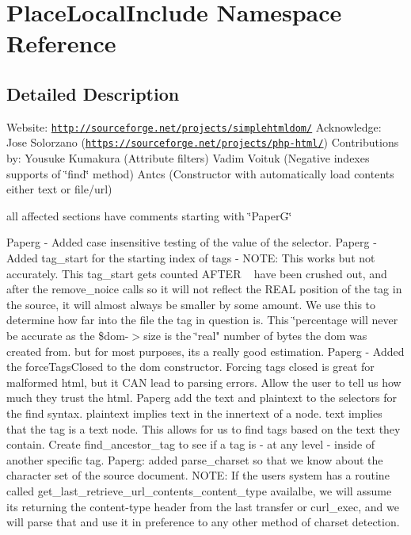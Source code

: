 \hypertarget{namespace_place_local_include}{}\section{Place\+Local\+Include Namespace Reference}
\label{namespace_place_local_include}


\subsection{Detailed Description}
Website\+: \href{http://sourceforge.net/projects/simplehtmldom/}{\tt http\+://sourceforge.\+net/projects/simplehtmldom/} Acknowledge\+: Jose Solorzano (\href{https://sourceforge.net/projects/php-html/}{\tt https\+://sourceforge.\+net/projects/php-\/html/}) Contributions by\+: Yousuke Kumakura (Attribute filters) Vadim Voituk (Negative indexes supports of \char`\"{}find\char`\"{} method) Antcs (Constructor with automatically load contents either text or file/url)

all affected sections have comments starting with \char`\"{}\+Paper\+G\char`\"{}

Paperg -\/ Added case insensitive testing of the value of the selector. Paperg -\/ Added tag\+\_\+start for the starting index of tags -\/ N\+O\+TE\+: This works but not accurately. This tag\+\_\+start gets counted A\+F\+T\+ER ~\newline
 have been crushed out, and after the remove\+\_\+noice calls so it will not reflect the R\+E\+AL position of the tag in the source, it will almost always be smaller by some amount. We use this to determine how far into the file the tag in question is. This \char`\"{}percentage will never be accurate as the \$dom-\/$>$size is the \char`\"{}real" number of bytes the dom was created from. but for most purposes, it\textquotesingle{}s a really good estimation. Paperg -\/ Added the force\+Tags\+Closed to the dom constructor. Forcing tags closed is great for malformed html, but it C\+AN lead to parsing errors. Allow the user to tell us how much they trust the html. Paperg add the text and plaintext to the selectors for the find syntax. plaintext implies text in the innertext of a node. text implies that the tag is a text node. This allows for us to find tags based on the text they contain. Create find\+\_\+ancestor\+\_\+tag to see if a tag is -\/ at any level -\/ inside of another specific tag. Paperg\+: added parse\+\_\+charset so that we know about the character set of the source document. N\+O\+TE\+: If the user\textquotesingle{}s system has a routine called get\+\_\+last\+\_\+retrieve\+\_\+url\+\_\+contents\+\_\+content\+\_\+type availalbe, we will assume it\textquotesingle{}s returning the content-\/type header from the last transfer or curl\+\_\+exec, and we will parse that and use it in preference to any other method of charset detection.

